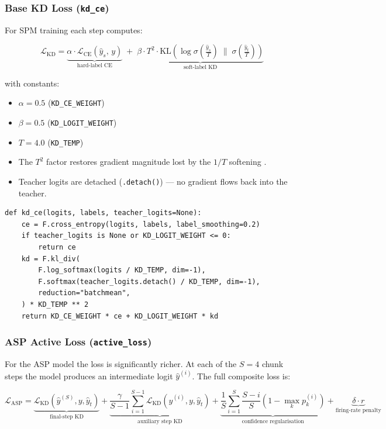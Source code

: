 \documentclass[11pt,a4paper]{article}
\begin{document}
\subsubsection*{Base KD Loss (\texttt{kd\_ce})}

For SPM training each step computes:

\[
\mathcal{L}_{\text{KD}} = \underbrace{\alpha \cdot \mathcal{L}_{\text{CE}}(\hat{y}_s,\, y)}_{\text{hard-label CE}} \;+\; \underbrace{\beta \cdot T^2 \cdot \text{KL}\!\left(\log\sigma\!\left(\tfrac{\hat{y}_s}{T}\right) \;\Big\|\; \sigma\!\left(\tfrac{\hat{y}_t}{T}\right)\right)}_{\text{soft-label KD}}
\]

with constants:
\begin{itemize}
  \item $\alpha = 0.5$ (\texttt{KD\_CE\_WEIGHT})
  \item $\beta = 0.5$ (\texttt{KD\_LOGIT\_WEIGHT})
  \item $T = 4.0$ (\texttt{KD\_TEMP})
  \item The $T^2$ factor restores gradient magnitude lost by the $1/T$ softening \cite{hinton2015distilling}.
  \item Teacher logits are detached (\texttt{.detach()}) — no gradient flows back into the teacher.
\end{itemize}

\begin{lstlisting}[caption={Base KD loss from \texttt{train\_a100.py} (lines 668--677).}]
def kd_ce(logits, labels, teacher_logits=None):
    ce = F.cross_entropy(logits, labels, label_smoothing=0.2)
    if teacher_logits is None or KD_LOGIT_WEIGHT <= 0:
        return ce
    kd = F.kl_div(
        F.log_softmax(logits / KD_TEMP, dim=-1),
        F.softmax(teacher_logits.detach() / KD_TEMP, dim=-1),
        reduction="batchmean",
    ) * KD_TEMP ** 2
    return KD_CE_WEIGHT * ce + KD_LOGIT_WEIGHT * kd
\end{lstlisting}

\subsubsection*{ASP Active Loss (\texttt{active\_loss})}

For the ASP model the loss is significantly richer. At each of the $S=4$ chunk steps the model produces an intermediate logit $\hat{y}^{(i)}$. The full composite loss is:

\[
\mathcal{L}_{\text{ASP}} = \underbrace{\mathcal{L}_{\text{KD}}(\hat{y}^{(S)}, y, \hat{y}_t)}_{\text{final-step KD}} + \underbrace{\frac{\gamma}{S-1}\sum_{i=1}^{S-1}\mathcal{L}_{\text{KD}}(\hat{y}^{(i)}, y, \hat{y}_t)}_{\text{auxiliary step KD}} + \underbrace{\frac{1}{S}\sum_{i=1}^{S}\frac{S-i}{S}\!\left(1 - \max_k p_k^{(i)}\right)}_{\text{confidence regularisation}} + \underbrace{\delta \cdot r}_{\text{firing-rate penalty}}
\]
\end{document}
